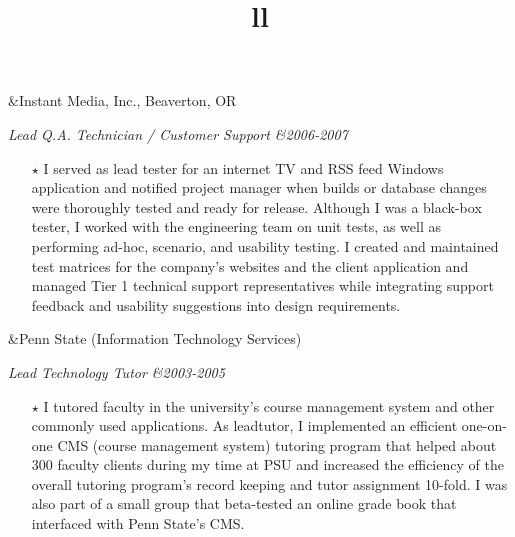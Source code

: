 \documentclass[11pt]{res} %
\begin{document}
\begin{resume}
\begin{ncolumn}{2}
	&\hfill{}Instant Media, Inc., Beaverton, OR \\
\end{ncolumn}{}
\begin{ncolumn}{2}
	\title{l}\itshape Lead Q.A. Technician / Customer Support &\hfill{}2006-2007 \\
\end{ncolumn}
\begin{itemize} \itemsep -2pt
	\item[$\star$]I served as lead tester for an internet TV and RSS feed Windows application and notified project manager when     builds or database changes were thoroughly tested and ready for release. Although I was a black-box tester, I worked with the engineering team on unit tests, as well as performing ad-hoc, scenario, and usability testing. I created and maintained test matrices for the company’s websites and the client application and managed Tier 1 technical support representatives while integrating support feedback and usability suggestions into design requirements.
\end{itemize}

\begin{ncolumn}{2}
	&\hfill{}Penn State (Information Technology Services)\\
\end{ncolumn}{}
\begin{ncolumn}{2}
	\title{l}\itshape Lead Technology Tutor &\hfill{}2003-2005 \\
\end{ncolumn}
\begin{itemize} \itemsep -2pt
	\item[$\star$]I tutored faculty in the university’s course management system and other commonly used applications. As leadtutor, I implemented an efficient one-on-one CMS (course management system) tutoring program that helped about 300 faculty clients during my time at PSU and increased the efficiency of the overall tutoring program’s record keeping and tutor assignment 10-fold. I was also part of a small group that beta-tested an online grade book that interfaced with Penn State’s CMS.
\end{itemize}


\end{resume}
\end{document}
